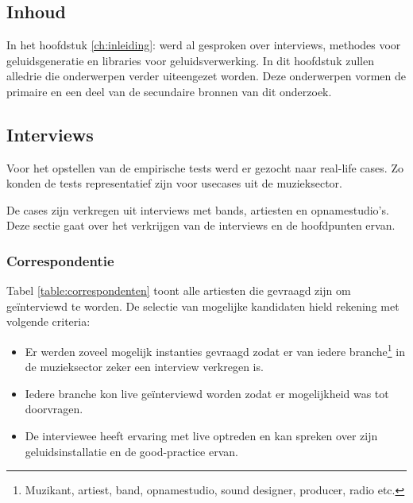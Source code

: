 \chapter{}
\label{ch:stand-van-zaken}



\section{Inhoud}

In het hoofdstuk \ref{ch:inleiding}:  werd al gesproken over interviews, methodes voor geluidsgeneratie en libraries voor geluidsverwerking. In dit hoofdstuk zullen alledrie die onderwerpen verder uiteengezet worden. Deze onderwerpen vormen de primaire en een deel van de secundaire bronnen van dit onderzoek.

\section{Interviews}
\label{sec:interviews}

Voor het opstellen van de empirische tests werd er gezocht naar real-life cases. Zo konden de tests representatief zijn voor usecases uit de muzieksector.

De cases zijn verkregen uit interviews met bands, artiesten en opnamestudio's. Deze sectie gaat over het verkrijgen van de interviews en de hoofdpunten ervan.

\subsection{Correspondentie}

Tabel \ref{table:correspondenten} toont alle artiesten die gevraagd zijn om geïnterviewd te worden. De selectie van mogelijke kandidaten hield rekening met volgende criteria:

\begin{itemize}
    \item Er werden zoveel mogelijk instanties gevraagd zodat er van iedere branche\footnote{Muzikant, artiest, band, opnamestudio, sound designer, producer, radio etc.} in de muzieksector zeker een interview verkregen is.
    \item Iedere branche kon live geïnterviewd worden zodat er mogelijkheid was tot doorvragen.
    \item De interviewee heeft ervaring met live optreden en kan spreken over zijn geluidsinstallatie en de good-practice ervan.
\end{itemize}{}

